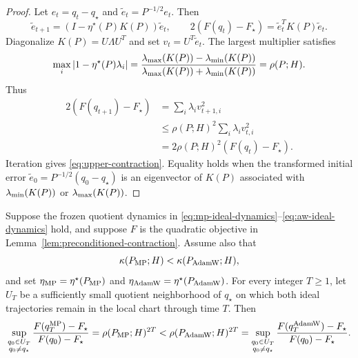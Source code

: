 \begin{proof}
Let $e_t=q_t-q_\star$ and $\widetilde e_t=P^{-1/2}e_t$.  Then
\begin{equation}
    \widetilde e_{t+1}
    =\left(I-\eta^\star(P)K(P)\right)\widetilde e_t,
    \qquad
    2(F(q_t)-F_\star)=\widetilde e_t^TK(P)\widetilde e_t.
\end{equation}
Diagonalize $K(P)=U\Lambda U^T$ and set $v_t=U^T\widetilde e_t$.  The largest multiplier
satisfies
\begin{equation}
    \max_i\left|1-\eta^\star(P)\lambda_i\right|
    =
    \frac{\lambda_{\max}(K(P))-\lambda_{\min}(K(P))}
    {\lambda_{\max}(K(P))+\lambda_{\min}(K(P))}
    =\rho(P;H).
\end{equation}
Thus
\begin{align}
    2(F(q_{t+1})-F_\star)
    &=\sum_i \lambda_i v_{t+1,i}^2 \\
    &\leq \rho(P;H)^2\sum_i \lambda_i v_{t,i}^2 \\
    &=2\rho(P;H)^2(F(q_t)-F_\star).
\end{align}
Iteration gives \eqref{eq:upper-contraction}.  Equality holds when the transformed
initial error $\widetilde e_0=P^{-1/2}(q_0-q_\star)$ is an eigenvector of $K(P)$
associated with $\lambda_{\min}(K(P))$ or $\lambda_{\max}(K(P))$.
\end{proof}

\begin{theorem}
\label{thm:conditional-optimization-separation}
Suppose the frozen quotient dynamics in \eqref{eq:mp-ideal-dynamics}--\eqref{eq:aw-ideal-dynamics} hold,
and suppose $F$ is the quadratic objective in Lemma~\ref{lem:preconditioned-contraction}.
Assume also that
\begin{equation}
    \kappa(P_{\operatorname{MP}};H)<\kappa(P_{\operatorname{AdamW}};H),
\end{equation}
and set $\eta_{\operatorname{MP}}=\eta^\star(P_{\operatorname{MP}})$ and
$\eta_{\operatorname{AdamW}}=\eta^\star(P_{\operatorname{AdamW}})$.  For every integer $T\geq1$, let $U_T$ be a
sufficiently small quotient neighborhood of $q_\star$ on which both ideal trajectories
remain in the local chart through time $T$.  Then
\begin{equation}
    \sup_{\substack{q_0\in U_T\\ q_0\neq q_\star}}
    \frac{F(q_T^{\operatorname{MP}})-F_\star}{F(q_0)-F_\star}
    =
    \rho(P_{\operatorname{MP}};H)^{2T}
    <
    \rho(P_{\operatorname{AdamW}};H)^{2T}
    =
    \sup_{\substack{q_0\in U_T\\ q_0\neq q_\star}}
    \frac{F(q_T^{\operatorname{AdamW}})-F_\star}{F(q_0)-F_\star}.
    \label{eq:main-separation}
\end{equation}
\end{theorem}

